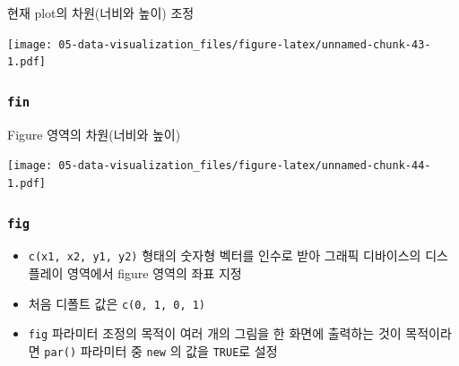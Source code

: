\documentclass[
  11pt,
]{krantz}
\makeatletter
\providecommand{\tightlist}{%
  \setlength{\itemsep}{0pt}\setlength{\parskip}{0pt}}
\newenvironment{kframe}{%
\medskip{}
\setlength{\fboxsep}{.8em}
 \def\at@end@of@kframe{}%
 \ifinner\ifhmode%
  \def\at@end@of@kframe{\end{minipage}}%
  \begin{minipage}{\columnwidth}%
 \fi\fi%
 \def\FrameCommand##1{\hskip\@totalleftmargin \hskip-\fboxsep
 \colorbox{shadecolor}{##1}\hskip-\fboxsep
     \hskip-\linewidth \hskip-\@totalleftmargin \hskip\columnwidth}%
 \MakeFramed {\advance\hsize-\width
   \@totalleftmargin\z@ \linewidth\hsize
   \@setminipage}}%
 {\par\unskip\endMakeFramed%
 \at@end@of@kframe}
\renewenvironment{quote}{\begin{kframe}}{\end{kframe}}
\makeatother
\begin{document}
\begin{quote}
현재 plot의 차원(너비와 높이) 조정
\end{quote}

\footnotesize

\texttt{[image: 05-data-visualization\_files/figure-latex/unnamed-chunk-43-1.pdf]}

\normalsize

\hypertarget{fin}{%
\subsubsection*{\texorpdfstring{\textbf{\texttt{fin}}}{fin}}\label{fin}}


\begin{quote}
Figure 영역의 차원(너비와 높이)
\end{quote}

\footnotesize

\texttt{[image: 05-data-visualization\_files/figure-latex/unnamed-chunk-44-1.pdf]}

\normalsize

\hypertarget{fig-par}{%
\subsubsection*{\texorpdfstring{\textbf{\texttt{fig}}}{fig}}\label{fig-par}}


\begin{quote}
\begin{itemize}
\tightlist
\item
  \texttt{c(x1,\ x2,\ y1,\ y2)} 형태의 숫자형 벡터를 인수로 받아 그래픽 디바이스의 디스플레이 영역에서 figure 영역의 좌표 지정
\item
  처음 디폴트 값은 \texttt{c(0,\ 1,\ 0,\ 1)}
\item
  \texttt{fig} 파라미터 조정의 목적이 여러 개의 그림을 한 화면에 출력하는 것이 목적이라면 \texttt{par()} 파라미터 중 \texttt{new} 의 값을 \texttt{TRUE}로 설정
\end{itemize}
\end{quote}

\footnotesize
\end{document}
